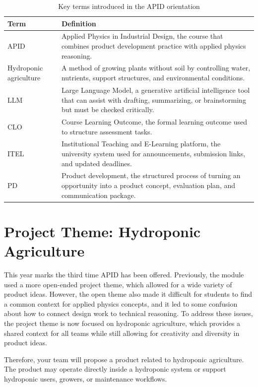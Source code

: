 \begin{table}[htbp]
\centering
\caption{Key terms introduced in the APID orientation}
\label{tab:session0-key-terms}
\renewcommand{\arraystretch}{1.2}
\begin{tabularx}{\textwidth}{|>{\raggedright\arraybackslash}p{}|X|}
\hline
\textbf{Term} & \textbf{Definition} \\
\hline
APID & Applied Physics in Industrial Design, the course that combines product development practice with applied physics reasoning. \\
\hline
Hydroponic agriculture & A method of growing plants without soil by controlling water, nutrients, support structures, and environmental conditions. \\
\hline
LLM & Large Language Model, a generative artificial intelligence tool that can assist with drafting, summarizing, or brainstorming but must be checked critically. \\
\hline
CLO & Course Learning Outcome, the formal learning outcome used to structure assessment tasks. \\
\hline
ITEL & Institutional Teaching and E-Learning platform, the university system used for announcements, submission links, and updated deadlines. \\
\hline
PD & Product development, the structured process of turning an opportunity into a product concept, evaluation plan, and communication package. \\
\hline
\end{tabularx}
\end{table}

\section{Project Theme: Hydroponic Agriculture}

This year marks the third time APID has been offered. Previously, the module used a more open-ended project theme, which allowed for a wide variety of product ideas. However, the open theme also made it difficult for students to find a common context for applied physics concepts, and it led to some confusion about how to connect design work to technical reasoning. To address these issues, the project theme is now focused on hydroponic agriculture, which provides a shared context for all teams while still allowing for creativity and diversity in product ideas. 

Therefore, your team will propose a product related to hydroponic agriculture. The product may operate directly inside a hydroponic system or support hydroponic users, growers, or maintenance workflows.

